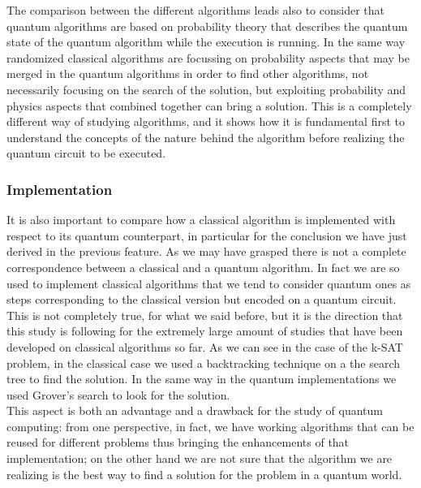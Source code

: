 \documentclass[english]{article}
\begin{document}
				The comparison between the different algorithms leads also to consider that quantum algorithms are based on probability theory that describes the quantum state of the quantum algorithm while the execution is running. In the same way randomized classical algorithms are focussing on probability aspects that may be merged in the quantum algorithms in order to find other algorithms, not necessarily focusing on the search of the solution, but exploiting probability and physics aspects that combined together can bring a solution. This is a completely different way of studying algorithms, and it shows how it is fundamental first to understand the concepts of the nature behind the algorithm before realizing the quantum circuit to be executed. 
			
			\subsubsection{Implementation}
			\label{sec:implementationComparison}
				It is also important to compare how a classical algorithm is implemented with respect to its quantum counterpart, in particular for the conclusion we have just derived in the previous feature. As we may have grasped there is not a complete correspondence between a classical and a quantum algorithm. In fact we are so used to implement classical algorithms that we tend to consider quantum ones as steps corresponding to the classical version but encoded on a quantum circuit. This is not completely true, for what we said before, but it is the direction that this study is following for the extremely large amount of studies that have been developed on classical algorithms so far. As we can see in the case of the k-SAT problem, in the classical case we used a backtracking technique on a the search tree to find the solution. In the same way in the quantum implementations we used Grover's search to look for the solution. \\
				
				This aspect is both an advantage and a drawback for the study of quantum computing: from one perspective, in fact, we have working algorithms that can be reused for different problems thus bringing the enhancements of that implementation; on the other hand we are not sure that the algorithm we are realizing is the best way to find a solution for the problem in a quantum world. 
				
\end{document}
